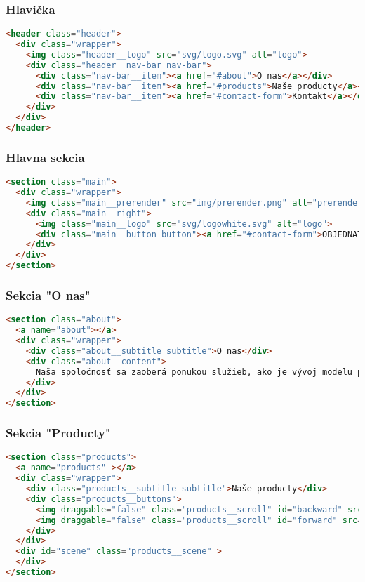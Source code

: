       \subsubsection*{Hlavička}
\begin{lstlisting}[language=html]
<header class="header">
  <div class="wrapper">
    <img class="header__logo" src="svg/logo.svg" alt="logo">
    <div class="header__nav-bar nav-bar">
      <div class="nav-bar__item"><a href="#about">O nas</a></div>
      <div class="nav-bar__item"><a href="#products">Naše producty</a></div>
      <div class="nav-bar__item"><a href="#contact-form">Kontakt</a></div>
    </div>
  </div>
</header>
\end{lstlisting}

    \subsubsection*{Hlavna sekcia}
\begin{lstlisting}[language=html]
<section class="main">
  <div class="wrapper">
    <img class="main__prerender" src="img/prerender.png" alt="prerender">
    <div class="main__right">
      <img class="main__logo" src="svg/logowhite.svg" alt="logo">
      <div class="main__button button"><a href="#contact-form">OBJEDNAŤ</a></div>
    </div>
  </div>
</section>
\end{lstlisting}

      \subsubsection*{Sekcia "O nas"}
\begin{lstlisting}[language=html]
<section class="about">
  <a name="about"></a>
  <div class="wrapper">
    <div class="about__subtitle subtitle">O nas</div>
    <div class="about__content">
      Naša spoločnosť sa zaoberá ponukou služieb, ako je vývoj modelu podľa vašich požiadaviek, predaj hotových riešení, tlač vašich modelov na 3D tlačiarni.
    </div>
  </div>
</section>
\end{lstlisting}

      \subsubsection*{Sekcia "Producty"}
\begin{lstlisting}[language=html]
<section class="products">
  <a name="products" ></a>
  <div class="wrapper">
    <div class="products__subtitle subtitle">Naše producty</div>
    <div class="products__buttons">
      <img draggable="false" class="products__scroll" id="backward" src="svg/left_arrow.svg" alt="left_arrow">
      <img draggable="false" class="products__scroll" id="forward" src="svg/right_arrow.svg" alt="right_arrow">
    </div>
  </div>
  <div id="scene" class="products__scene" >
  </div>
</section>
\end{lstlisting}

